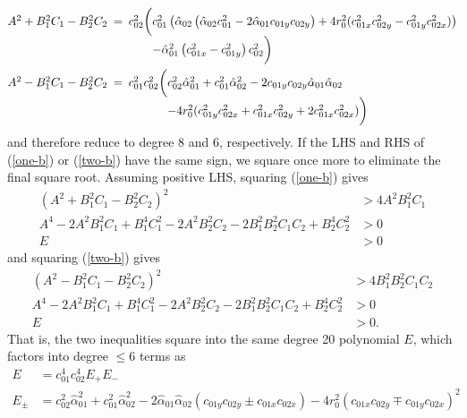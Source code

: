 \documentclass[11pt]{article}
\newcommand{\halpha}{\hat{\alpha}}
\begin{document}
\begin{align*}
\begin{array}{@{}r} A^2 + B_1^2 C_1 - B_2^2 C_2 \phantom{\bigg(} \hspace{-.5em}= \\ \phantom{\bigg(} \end{array}&%
\begin{array}{@{}r@{}l@{}} c_{02}^2 \bigg(& c_{01}^2 \left(\halpha_{02} \left(\halpha_{02} c_{01}^2 - 2 \halpha_{01} c_{01y} c_{02y}\right)
  + 4 r_0^2 (c_{01x}^2 c_{02y}^2 - c_{01y}^2 c_{02x}^2)\right) \\
  &- \halpha_{01}^2 \left(c_{01x}^2 - c_{01y}^2\right) c_{02}^2 \bigg) \end{array} \\
\begin{array}{@{}r} A^2 - B_1^2 C_1 - B_2^2 C_2 \phantom{\bigg(} \hspace{-.5em}= \\ \phantom{\bigg(} \end{array}&%
\begin{array}{@{}r@{}l@{}} c_{01}^2 c_{02}^2 \bigg(& c_{02}^2 \halpha_{01}^2 + c_{01}^2 \halpha_{02}^2 - 2 c_{01y} c_{02y} \halpha_{01} \halpha_{02} \\
  &- 4 r_0^2 (c_{01y}^2 c_{02x}^2 + c_{01x}^2 c_{02y}^2 + 2c_{01x}^2 c_{02x}^2) \bigg) \end{array}
\end{align*}
and therefore reduce to degree 8 and 6, respectively.  If the LHS and RHS of (\ref{one-b}) or (\ref{two-b}) have the same sign, we square once
more to eliminate the final square root.  Assuming positive LHS, squaring (\ref{one-b}) gives
\begin{align*}
(A^2 + B_1^2 C_1 - B_2^2 C_2)^2 &> 4 A^2 B_1^2 C_1 \\
A^4 - 2A^2 B_1^2 C_1 + B_1^4 C_1^2 - 2 A^2 B_2^2 C_2 - 2 B_1^2 B_2^2 C_1 C_2 + B_2^4 C_2^2 &> 0 \\
E &> 0 
\end{align*}
and squaring (\ref{two-b}) gives
\begin{align*}
(A^2 - B_1^2 C_1 - B_2^2 C_2)^2 &> 4 B_1^2 B_2^2 C_1 C_2 \\
A^4 - 2A^2 B_1^2 C_1 + B_1^4 C_1^2 - 2 A^2 B_2^2 C_2 - 2 B_1^2 B_2^2 C_1 C_2 + B_2^4 C_2^2 &> 0 \\
E &> 0.
\end{align*}
That is, the two inequalities square into the same degree 20 polynomial $E$, which factors into degree $\le 6$ terms as
\begin{align*}
E &= c_{01}^4 c_{02}^4 E_+ E_- \\
E_\pm &= c_{02}^2 \halpha_{01}^2 + c_{01}^2 \halpha_{02}^2 - 2 \halpha_{01} \halpha_{02} (c_{01y} c_{02y} \pm c_{01x} c_{02x}) - 4 r_0^2 (c_{01x} c_{02y} \mp c_{01y} c_{02x})^2
\end{align*}
\end{document}
